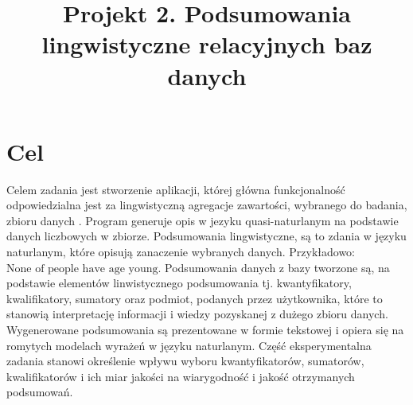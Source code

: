 \documentclass{classrep}
\author{
  \studentinfo{Daria Rogowska}{229989} \and
  \studentinfo{Mateusz Srebnik}{230004} }
\title{Projekt 2.  Podsumowania lingwistyczne relacyjnych baz danych}
\begin{document}
\maketitle


\section{Cel}

Celem zadania jest stworzenie aplikacji, której główna funkcjonalność odpowiedzialna jest za lingwistyczną agregacje zawartości, wybranego do badania, zbioru danych \cite{database}. 
Program generuje opis w jezyku quasi-naturlanym na podstawie danych liczbowych w zbiorze. Podsumowania lingwistyczne, są to zdania w języku naturlanym, które opisują zanaczenie wybranych danych. Przykładowo: \(\text{None of people have age young.}\)  
Podsumowania danych z bazy tworzone są, na podstawie elementów linwistycznego podsumowania tj. kwantyfikatory, kwalifikatory, sumatory oraz podmiot, podanych przez użytkownika, które to stanowią interpretację informacji i wiedzy pozyskanej z dużego zbioru danych.
Wygenerowane podsumowania są prezentowane w formie tekstowej i opiera się na romytych modelach wyrażeń w języku naturlanym.
Część eksperymentalna zadania stanowi określenie 
wpływu wyboru kwantyfikatorów, sumatorów, kwalifikatorów i ich miar jakości na wiarygodność i jakość otrzymanych podsumowań. 


\end{document}
